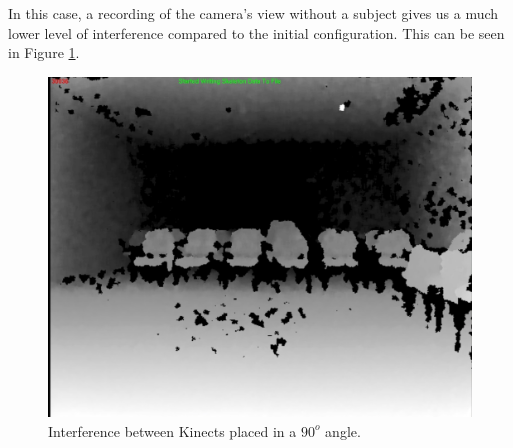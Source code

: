 \documentclass[10pt]{article}
\begin{document}
In this case, a recording of the camera's view without a subject gives us a much lower level of interference compared to the initial configuration. This can be seen in Figure \ref{IR_interference_90}.

\begin{figure}[H]
\centering
\includegraphics[scale=0.2]{IR_Interference90deg.jpg}
\caption{Interference between Kinects placed in a $90^o$ angle.}
\label{IR_interference_90}
\end{figure}
 
\end{document}
